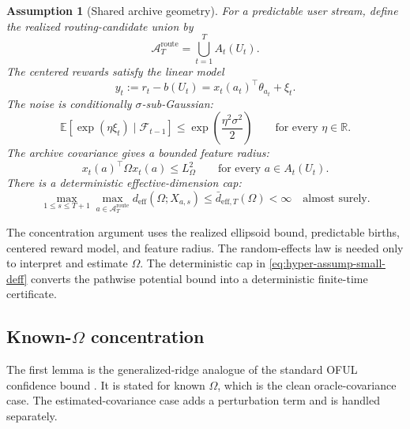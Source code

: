 \documentclass{article} %
\newtheorem{assumption}{Assumption}
\begin{document}
\begin{assumption}[Shared archive geometry]
For a predictable user stream, define the realized routing-candidate union by
\begin{equation}
\label{eq:hyper-route-union}
\mathcal A_T^{\mathrm{route}}
=
\bigcup_{t=1}^{T}A_t(U_t).
\end{equation}
The centered rewards satisfy the linear model
\begin{equation}
\label{eq:hyper-assump-linear}
y_t:=r_t-b(U_t)=x_t(a_t)^\top\theta_{a_t}+\xi_t .
\end{equation}
The noise is conditionally \(\sigma\)-sub-Gaussian:
\begin{equation}
\label{eq:hyper-assump-subg}
\mathbb{E}
\!\left[
\exp(\eta\xi_t)\mid\mathcal{F}_{t-1}
\right]
\le
\exp\!\left(\frac{\eta^2\sigma^2}{2}\right)
\qquad
\text{for every }\eta\in\mathbb{R}.
\end{equation}
The archive covariance gives a bounded feature radius:
\begin{equation}
\label{eq:hyper-assump-radius}
x_t(a)^\top\Omega x_t(a)
\le
L_{\Omega}^2
\qquad
\text{for every }a\in A_t(U_t).
\end{equation}
There is a deterministic effective-dimension cap:
\begin{equation}
\label{eq:hyper-assump-small-deff}
\max_{1\le s\le T+1}\max_{a\in\mathcal A_T^{\mathrm{route}}}
d_{\mathrm{eff}}(\Omega;X_{a,s})
\le
\bar d_{\mathrm{eff},T}(\Omega)
<\infty
\quad\text{almost surely}.
\end{equation}
\end{assumption}

The concentration argument uses the realized ellipsoid bound, predictable
births, centered reward model, and feature radius. The random-effects law is
needed only to interpret and estimate $\Omega$. The deterministic cap in
\eqref{eq:hyper-assump-small-deff} converts the pathwise potential bound into
a deterministic finite-time certificate.

\subsection{Known-\(\Omega\) concentration}

The first lemma is the generalized-ridge analogue of the standard OFUL confidence bound \citep{abbasi2011oful,chu2011linucb}.  It is stated for known \(\Omega\), which is the clean oracle-covariance case.  The estimated-covariance case adds a perturbation term and is handled separately.
\end{document}
